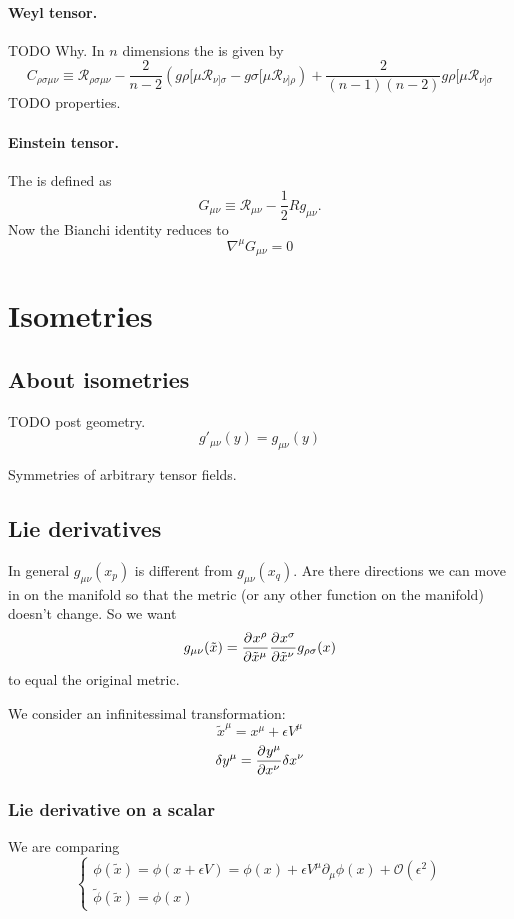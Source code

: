 \paragraph{Weyl tensor.} TODO Why. In $n$ dimensions the  is given by
\[ C_{\rho\sigma\mu\nu} \equiv \mathcal{R}_{\rho\sigma\mu\nu} - \frac{2}{n-2}\left(g{\rho[\mu}\mathcal{R}_{\nu]\sigma} - g{\sigma[\mu}\mathcal{R}_{\nu]\rho}\right) + \frac{2}{(n-1)(n-2)}g{\rho[\mu}\mathcal{R}_{\nu]\sigma} \]
TODO properties.

\paragraph{Einstein tensor.} The  is defined as
\[ G_{\mu\nu} \equiv \mathcal{R}_{\mu\nu} - \frac{1}{2}Rg_{\mu\nu}. \]
Now the Bianchi identity reduces to
\[ \boxed{\nabla^{\mu}G_{\mu\nu} = 0} \]


\section{Isometries}
\subsection{About isometries}
TODO post geometry.
\[ g'_{\mu\nu}(y) = g_{\mu\nu}(y) \]

Symmetries of arbitrary tensor fields.
\subsection{Lie derivatives}
In general $g_{\mu\nu}(x_p)$ is different from $g_{\mu\nu}(x_q)$. Are there directions we can move in on the manifold so that the metric (or any other function on the manifold) doesn't change.
So we want
\[ g_{\mu\nu}(\tilde{x}) =  \frac{\partial{^{}}x^\rho}{\partial{{\tilde{x}{^\mu}}^{}}}  \frac{\partial{^{}}x^\sigma}{\partial{{\tilde{x}{^\nu}}^{}}} g_{\rho\sigma}(x) \]
to equal the original metric.

We consider an infinitessimal transformation:
\[ \tilde{x}^\mu = x^\mu+\epsilon V^\mu \]
\[ \delta y^\mu =  \frac{\partial{^{}}y^\mu}{\partial{{x^\nu}^{}}} \delta x^\nu \]

\subsubsection{Lie derivative on a scalar}
We are comparing
\[  \begin{cases}
\phi(\tilde{x}) = \phi(x + \epsilon V) = \phi(x) + \epsilon V^\mu\partial_\mu \phi(x) + \mathcal{O}(\epsilon^2) \\
\tilde{\phi}(\tilde{x}) = \phi(x)
\end{cases}\]

